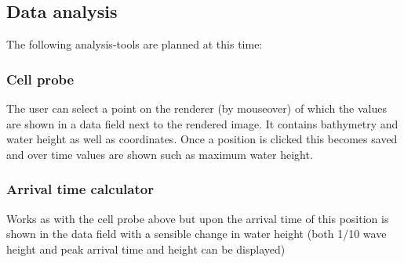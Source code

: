 \documentclass[paper=a4]{proc}
\begin{document}
 		\subsection{Data analysis}
			The following analysis-tools are planned at this time:
			\subsubsection*{Cell probe}
				The user can select a point on the renderer (by mouseover) of which the values are shown in a data field next to the rendered image. It contains bathymetry and water height as well as coordinates. Once a position is clicked this becomes saved and over time values are shown such as maximum water height.
			\subsubsection*{Arrival time calculator}
				Works as with the cell probe above but upon the arrival time of this position is shown in the data field with a sensible change in water height (both 1/10 wave height and peak arrival time and height can be displayed)
			
\end{document}
